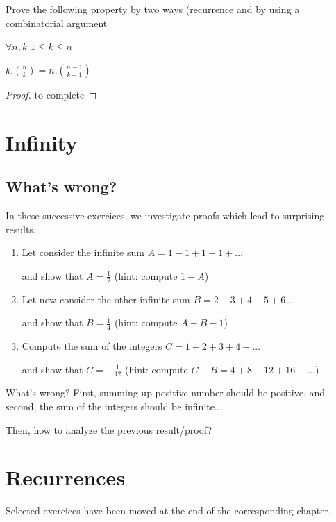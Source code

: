Prove the following property by two ways (recurrence and by using a combinatorial argument
\begin{prop}
$\forall n,k$ $1 \leq k \leq n$

$k.{n \choose k} = n.{{n-1} \choose {k-1}}$
\end{prop}

\begin{proof}
to complete
\end{proof}




\section{Infinity}

\subsection{What's wrong?}

In these successive exercices, we investigate proofs which lead to surprising results...

\begin{enumerate}
\item
Let consider the infinite sum $A = 1-1+1-1+ \ldots$

and show that $A=\frac{1}{2}$ (hint: compute $1-A$)
\item
Let now consider the other infinite sum $B=2-3+4-5+6 \ldots$

and show that $B=\frac{1}{4}$ (hint: compute $A+B-1$)
\item 
Compute the sum of the integers $C=1+2+3+4+ \ldots$

and show that $C=-\frac{1}{12}$ (hint: compute $C-B=4+8+12+16+ \ldots$)
\end{enumerate}

What's wrong?
First, summing up positive number should be positive, 
and second, the sum of the integers should be infinite...

Then, how to analyze the previous result/proof?



\section{Recurrences}

Selected exercices have been moved at the end of the corresponding chapter.

